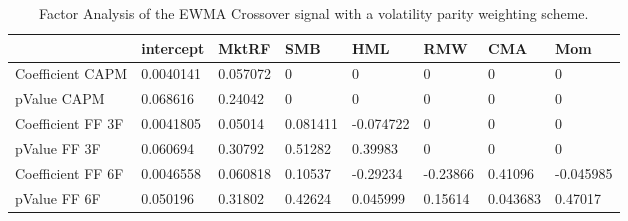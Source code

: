 \begin{table}[H]
\centering
\begin{tabular}{llllllll}
& intercept & MktRF & SMB & HML & RMW & CMA & Mom \\ 
\hline 
Coefficient CAPM & 0.0040141 & 0.057072 & 0 & 0 & 0 & 0 & 0 \\ 
pValue CAPM & 0.068616 & 0.24042 & 0 & 0 & 0 & 0 & 0 \\ 
Coefficient FF 3F & 0.0041805 & 0.05014 & 0.081411 & -0.074722 & 0 & 0 & 0 \\ 
pValue FF 3F & 0.060694 & 0.30792 & 0.51282 & 0.39983 & 0 & 0 & 0 \\ 
Coefficient FF 6F & 0.0046558 & 0.060818 & 0.10537 & -0.29234 & -0.23866 & 0.41096 & -0.045985 \\ 
pValue FF 6F & 0.050196 & 0.31802 & 0.42624 & 0.045999 & 0.15614 & 0.043683 & 0.47017 \\ 
\hline
\end{tabular}
\caption{Factor Analysis of the EWMA Crossover signal with a volatility parity weighting scheme.}
\label{MBBS2_FACTOR}
\end{table}